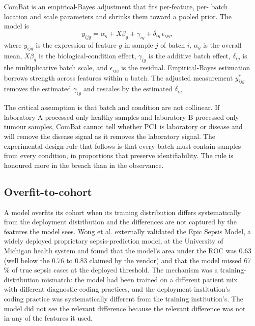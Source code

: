 

ComBat is an empirical-Bayes adjustment that fits per-feature, per-
batch location and scale parameters and shrinks them toward a pooled
prior. The model is
\[
y_{ijg} = \alpha_{g} + X\beta_{g} + \gamma_{ig} + \delta_{ig}\,\epsilon_{ijg},
\]
where $y_{ijg}$ is the expression of feature $g$ in sample $j$ of
batch $i$, $\alpha_{g}$ is the overall mean, $X\beta_{g}$ is the
biological-condition effect, $\gamma_{ig}$ is the additive batch
effect, $\delta_{ig}$ is the multiplicative batch scale, and
$\epsilon_{ijg}$ is the residual. Empirical-Bayes estimation borrows
strength across features within a batch. The adjusted measurement
$y_{ijg}^{\ast}$ removes the estimated $\gamma_{ig}$ and rescales by
the estimated $\delta_{ig}$.

The critical assumption is that batch and condition are not collinear.
If laboratory A processed only healthy samples and laboratory B
processed only tumour samples, ComBat cannot tell whether PC1 is
laboratory or disease and will remove the disease signal as it removes
the laboratory signal. The experimental-design rule that follows is
that every batch must contain samples from every condition, in
proportions that preserve identifiability. The rule is honoured more
in the breach than in the observance.

\subsection{Overfit-to-cohort}

A model overfits its cohort when its training distribution differs
systematically from the deployment distribution and the differences
are not captured by the features the model sees. Wong et al.
\cite{paper:v6c11-wong-sepsis-2021} externally validated the Epic
Sepsis Model, a widely deployed proprietary sepsis-prediction model,
at the University of Michigan health system and found that the model's
area under the ROC was 0.63 (well below the 0.76 to 0.83 claimed by the
vendor) and that the model missed 67$\%$ of true sepsis cases at the
deployed threshold. The mechanism was a training-distribution mismatch:
the model had been trained on a different patient mix with different
diagnostic-coding practices, and the deployment institution's coding
practice was systematically different from the training institution's.
The model did not see the relevant difference because the relevant
difference was not in any of the features it used.

